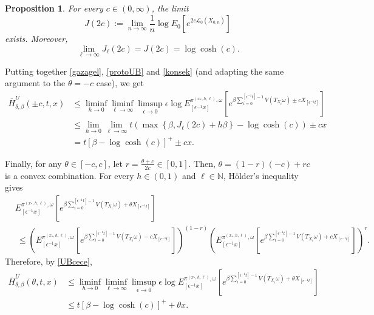 \documentclass[a4paper]{amsart}
\numberwithin{equation}{section}
\theoremstyle{plain}
\newtheorem{proposition}[theorem]{\sc Proposition}
\theoremstyle{remark}
\begin{document}
\begin{proposition}\label{countexcursion}
For every $c\in(0,\infty)$, the limit
$$J(2c) := \lim_{n\to\infty}\frac1{n}\log E_0\left[e^{2c\mathcal{L}_0(X_{0,n})}\right]$$
exists. Moreover,
$$\lim_{\ell\to\infty}J_\ell(2c) = J(2c) = \log\cosh(c).$$
\end{proposition}

Putting together \eqref{gazagel}, \eqref{protoUB} and \eqref{konsek} (and adapting the same argument to the $\theta = -c$ case), we get
\begin{equation}
\begin{aligned}\label{UBcece}
\overline H_{\delta,\beta}^U(\pm c,t,x) &\le \liminf_{h\to 0}\liminf_{\ell\to\infty}\limsup_{{\epsilon}\to0}{\epsilon}\log E_{[{\epsilon^{-1}} x]}^{{\pi^{(x_*,h,\ell)}},\omega}\left[e^{\beta\sum_{i=0}^{[{\epsilon^{-1}} t]-1}V(T_{X_i}\omega) \pm c X_{[{\epsilon^{-1}} t]}}\right]\\ &\le \lim_{h\to 0}\lim_{\ell\to\infty}t\left(\max\left\{\beta,J_\ell(2c) + h\beta\right\} - \log\cosh(c)\right) \pm cx\\
&= t[\beta - \log\cosh(c)]^+ \pm cx.
\end{aligned}
\end{equation}

Finally, for any $\theta\in [-c,c]$, let $r = \frac{\theta +c}{2c}\in [0,1]$. Then, $\theta = (1-r)(-c) + rc$ is a convex combination. For every $h\in(0,1)$ and $\ell\in\mathbb{N}$, H\"older's inequality gives
\begin{align*}
&E_{[{\epsilon^{-1}} x]}^{{\pi^{(x_*,h,\ell)}},\omega}\left[e^{\beta\sum_{i=0}^{[{\epsilon^{-1}} t]-1} V(T_{X_i}\omega) + \theta X_{[{\epsilon^{-1}} t]}}\right]\\ &\ \le \left(E_{[{\epsilon^{-1}} x]}^{{\pi^{(x_*,h,\ell)}},\omega}\left[e^{\beta\sum_{i=0}^{[{\epsilon^{-1}} t]-1} V(T_{X_i}\omega) - c X_{[{\epsilon^{-1}} t]}}\right]\right)^{(1-r)} \left(E_{[{\epsilon^{-1}} x]}^{{\pi^{(x_*,h,\ell)}},\omega}\left[e^{\beta\sum_{i=0}^{[{\epsilon^{-1}} t]-1} V(T_{X_i}\omega) + c X_{[{\epsilon^{-1}} t]}}\right]\right)^r.
\end{align*}
Therefore, by \eqref{UBcece},
\begin{equation}
\begin{aligned}\label{UBpart2}
\overline H_{\delta,\beta}^U(\theta,t,x) &\le \liminf_{h\to 0}\liminf_{\ell\to\infty}\limsup_{{\epsilon}\to0}{\epsilon}\log E_{[{\epsilon^{-1}} x]}^{{\pi^{(x_*,h,\ell)}},\omega}\left[e^{\beta\sum_{i=0}^{[{\epsilon^{-1}} t]-1}V(T_{X_i}\omega) + \theta X_{[{\epsilon^{-1}} t]}}\right]\\
&\le t[\beta - \log\cosh(c)]^+ + \theta x.
\end{aligned}
\end{equation}
\end{document}
